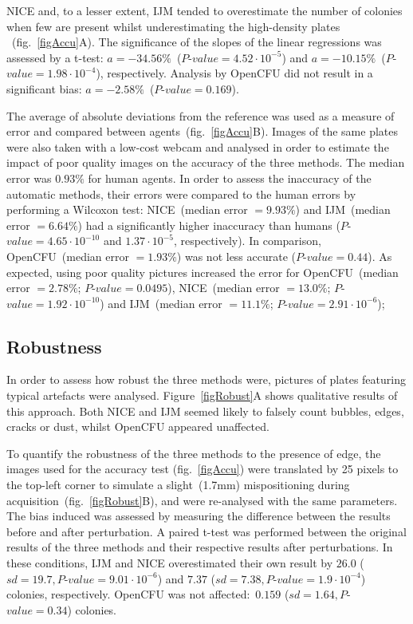 \documentclass[10pt]{article}
\newcommand{\IJM}{IJM}
\newcommand{\EdgeNoiseOCFU}{$0.159$ ($sd=1.64, P$-$value=0.34$)}
\newcommand{\EdgeNoiseIJM}{$26.0$ ($sd=19.7, P$-$value=9.01\cdot 10^{-6}$)}
\newcommand{\EdgeNoiseNICE}{$7.37$ ($sd=7.38,P$-$value=1.9\cdot 10^{-4}$)}
\begin{document}
NICE and, to a lesser extent, \IJM{} tended to overestimate the number of
colonies when few are present
whilst underestimating the high-density
plates 
~(fig.~\ref{figAccu}A). The significance of the slopes of the linear
regressions was assessed by a t-test:
$a = -34.56\%$~($P$-$value = 4.52 \cdot 10^{-5}$) and $a = -10.15\%$~($P$-$value =
1.98  \cdot 10^{-4}$), respectively. Analysis by OpenCFU did not result
in a significant bias: $a = -2.58\%$~($P$-$value = 0.169$).

The average of absolute deviations from the reference was used
as a measure of error and compared between agents~(fig.~\ref{figAccu}B).
Images of the same plates were also taken with a low-cost webcam and analysed in
order to estimate the impact of poor quality images on the accuracy of the three
methods.
The median error was $0.93\%$ for human agents. In order to assess the
inaccuracy of the automatic methods, their errors were compared to the human
errors by performing a Wilcoxon test:
NICE~(median error $= 9.93\%$) and \IJM{}~(median error $= 6.64\%$) had a significantly higher inaccuracy than
humans ($P$-$value = 4.65\cdot 10^{-10}$ and $1.37\cdot 10^{-5}$, respectively).
In comparison, OpenCFU~(median error $= 1.93\%$) was not less accurate ($P$-$value = 0.44$).
As expected, using poor quality pictures increased the error for OpenCFU~(median error $= 2.78\%$; $P$-$value =
0.0495$), NICE~(median error $= 13.0\%$; $P$-$value = 1.92 \cdot 10^{-10}$) and \IJM{}~(median error $= 11.1\%$; $P$-$value = 2.91 \cdot 10^{-6} $);

\subsection*{Robustness} 
In order to assess how robust the three methods were,
pictures of plates featuring typical artefacts were analysed.
Figure~\ref{figRobust}A shows qualitative results of this approach.
Both NICE and \IJM{} seemed likely to falsely count bubbles, edges, cracks or
dust, whilst OpenCFU appeared unaffected.

To quantify the robustness of the three methods to the presence of edge, the
images used for the accuracy test (fig.~\ref{figAccu}) were translated by 25 pixels to the top-left
corner to simulate a slight~(1.7mm) mispositioning during
acquisition~(fig.~\ref{figRobust}B), and were re-analysed with the same
parameters.
The bias induced was assessed by measuring the difference between the results
before and after perturbation. A paired t-test was performed between the
original results of the three methods and their respective results after perturbations.
In these conditions, \IJM{} and NICE overestimated their own result by
\EdgeNoiseIJM{} and \EdgeNoiseNICE{} colonies, respectively. OpenCFU was not affected:~\EdgeNoiseOCFU{} colonies.
\end{document}
